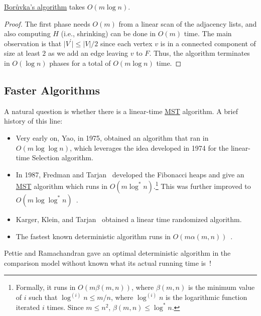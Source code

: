 \begin{theorem}\label{thm:Boruvka}
	\hyperref[algo:Boruvka]{Borůvka's algorithm} takes \(O(m \log n)\).
\end{theorem}
\begin{proof}
	The first phase needs \(O(m)\) from a linear scan of the adjacency lists, and also computing \(H\) (i.e., shrinking) can be done in \(O(m)\) time. The main observation is that \(\lvert V^{\prime} \rvert \leq \lvert V \rvert / 2\) since each vertex \(v\) is in a connected component of size at least \(2\) as we add an edge leaving \(v\) to \(F\). Thus, the algorithm terminates in \(O(\log n)\) phases for a total of \(O(m \log n)\) time.
\end{proof}

\subsection{Faster Algorithms}
A natural question is whether there is a linear-time \hyperref[prb:MST]{MST} algorithm. A brief history of this line:
\begin{itemize}
	\item Very early on, Yao, in 1975, obtained an algorithm that ran in \(O(m \log \log n)\)\cite{yao1975log}, which leverages the idea developed in 1974 for the linear-time Selection algorithm.
	\item In 1987, Fredman and Tarjan~\cite{fredman1987fibonacci} developed the Fibonacci heaps and give an \hyperref[prb:MST]{MST} algorithm which runs in \(O(m \log ^{\ast} n)\).\footnote{Formally, it runs in \(O(m \beta (m, n))\), where \(\beta (m, n)\) is the minimum value of \(i\) such that \(\log^{(i)} n \leq m / n\), where \(\log ^{(i)} n\) is the logarithmic function iterated \(i\) times. Since \(m \leq n^2\), \(\beta (m, n) \leq \log ^{\ast} n\).} This was further improved to \(O(m \log \log ^{\ast} n)\)~\cite{gabow1986efficient}.
	\item Karger, Klein, and Tarjan~\cite{karger1995randomized} obtained a linear time randomized algorithm.
	\item The fastest known deterministic algorithm runs in \(O(m \alpha (m, n))\)~\cite{chazelle2000minimum}.
\end{itemize}

\begin{note}
	Pettie and Ramachandran gave an optimal deterministic algorithm in the comparison model without known what its actual running time is~\cite{pettie2002optimal}!
\end{note}

